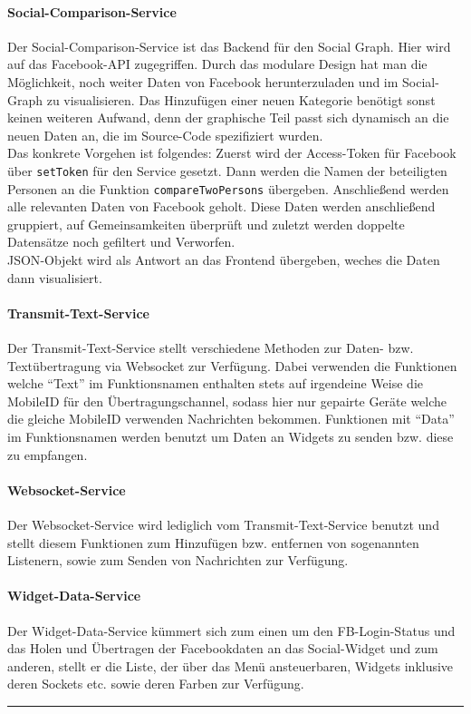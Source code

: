 \documentclass[10pt,a4paper]{report}
\newcommand{\HRule}{\rule{\linewidth}{0.1pt}} %
\begin{document}
				\paragraph{Social-Comparison-Service}
					Der Social-Comparison-Service ist das Backend für den Social Graph. Hier wird auf das Facebook-API zugegriffen. Durch das modulare Design hat man die Möglichkeit, noch weiter Daten von Facebook herunterzuladen und im Social-Graph zu visualisieren. Das Hinzufügen einer neuen Kategorie benötigt sonst keinen weiteren Aufwand, denn der graphische Teil passt sich dynamisch an die neuen Daten an, die im Source-Code spezifiziert wurden. 
\\
Das konkrete Vorgehen ist folgendes: Zuerst wird der Access-Token für Facebook über \texttt{setToken} für den Service gesetzt. Dann werden die Namen der beteiligten Personen an die Funktion \texttt{compareTwoPersons} übergeben. Anschließend werden alle relevanten Daten von Facebook geholt. Diese Daten werden anschließend gruppiert, auf Gemeinsamkeiten überprüft und zuletzt werden doppelte Datensätze noch gefiltert und Verworfen.
\\
\textsc{JSON}-Objekt wird als Antwort an das Frontend übergeben, weches die Daten dann visualisiert.
				\paragraph{Transmit-Text-Service}
					Der Transmit-Text-Service stellt verschiedene Methoden zur Daten- bzw. Textübertragung via Websocket zur Verfügung. Dabei verwenden die Funktionen welche "`Text"' im Funktionsnamen enthalten stets auf irgendeine Weise die MobileID für den Übertragungschannel, sodass hier nur gepairte Geräte welche die gleiche MobileID verwenden Nachrichten bekommen. Funktionen mit "`Data"' im Funktionsnamen werden benutzt um Daten an Widgets zu senden bzw. diese zu empfangen.
				\paragraph{Websocket-Service}
					Der Websocket-Service wird lediglich vom Transmit-Text-Service benutzt und stellt diesem Funktionen zum Hinzufügen bzw. entfernen von sogenannten Listenern, sowie zum Senden von Nachrichten zur Verfügung.
				\paragraph{Widget-Data-Service}
					Der Widget-Data-Service kümmert sich zum einen um den FB-Login-Status und das Holen und Übertragen der Facebookdaten an das Social-Widget und zum anderen, stellt er die Liste, der über das Menü ansteuerbaren, Widgets inklusive deren Sockets etc. sowie deren Farben zur Verfügung.\\
					\HRule
\end{document}
